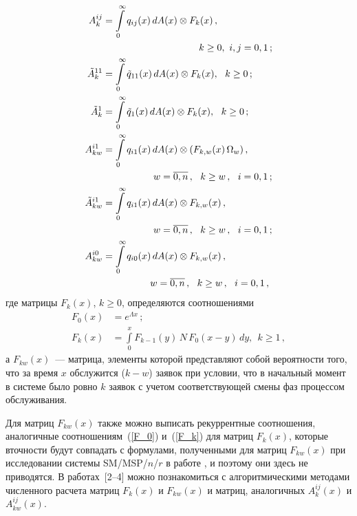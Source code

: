 \begin{multicols}{2}
\noindent
\begin{align}
A^{ij}_{k} &=
\int\limits^\infty_0 q_{ij}(x)\,d A(x)
\otimes F_{k}(x)\,,\notag\\
&\ \ \ \ \ \ \ \ \ \ \ \ \ \hspace*{20mm}  k\ge0, \  i,j=0,1\,;\label{A_1}\\
\Tilde A^{11}_k &=
\int\limits^\infty_0 \Tilde q_{11}(x)\,d A(x)
\otimes F_{k}(x),
\ \ k\ge0\,;\notag\\
\Tilde A^1_k & =
\int\limits^\infty_0 \Tilde q_1(x)\,dA(x)
\otimes F_{k}(x),
\ \ k\ge0\,;\notag
\\
A^{i1}_{kw} & =
\int\limits^\infty_0 q_{i1}(x)\,d A(x)
\otimes (F_{k,w}(x)\, \Omega_{w})\,,\notag\\
&\ \ \ \ \ \ \ \ \ \hspace*{8mm}  w=\overline{0,n}\,, \ \ k \ge w\,, \ \ i=0,1\,;\notag
\\
\Tilde A^{i1}_{kw} & =
\int\limits^\infty_0 q_{i1}(x)\,d A(x)
\otimes F_{k,w}(x)\,,\notag\\
& \ \ \ \ \ \ \ \ \ \hspace*{8mm} w=\overline{0,n}\,, \ \ k \ge w\,, \ \ i=0,1\,;\label{A_3}\\
A^{i0}_{kw} & =
\int\limits^\infty_0 q_{i0}(x)\,d A(x)
\otimes F_{k,w}(x)\,,\notag\\
& \ \ \ \ \ \ \ \ \hspace*{8mm} w=\overline{0,n}\,, \ \ k \ge w\,, \ \ i=0,1\,, \label{A_4}
\end{align}
где матрицы $F_k(x)$, $k\ge 0$, определяются соотношениями
\begin{align}
F_{0}(x)&= e^{\Lambda x}\,; \label{F_0} \\
F_{k}(x) & =
\int\limits^x_0
F_{k-1}(y)\,N\,F_{0}(x-y)\, dy,\ \ k\ge1\,,\label{F_k}
\end{align}
а $F_{kw}(x)$~--- матрица, элементы которой представляют собой вероятности того,
что за время $x$ обслужится ($k-w$) заявок при условии,
что в начальный момент в системе было ровно $k$ заявок
с учетом соответствующей смены фаз процессом обслуживания.

Для матриц $F_{kw}(x)$ также можно выписать рекуррентные соотношения,
аналогичные со\-от\-но\-шениям~(\ref{F_0}) и~(\ref{F_k}) для матриц $F_k(x)$,
которые в\linebreak точности будут совпадать с формулами,
полученными для  матриц $F_{kw}(x)$ при исследовании системы SM/MSP/$n$/$r$ в работе \cite{PCh04},
и поэтому они здесь не приводятся.
В работах~[2--4]
можно познакомиться с алгоритмическими методами численного расчета матриц $F_k(x)$ и $F_{kw}(x)$ и матриц,
аналогичных $A^{ij}_k(x)$ и $A^{ij}_{kw}(x)$.


\end{multicols}
